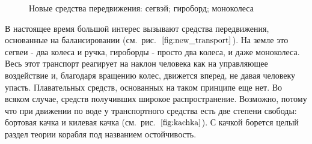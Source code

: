 \documentclass[12pt,a4paper]{article}
\begin{document}
\begin{figure}[ht!]  
	\vspace{4ex} 
	\centering {}  
	\hspace{4ex}
	\hspace{4ex}
	\caption{Новые средства передвижения:  сегвэй;  гироборд;  моноколеса} 
	\label{fig:new_transport}
\end{figure}


В настоящее время большой интерес вызывают средства передвижения, основанные на балансировании (см.~рис.~$\ref{fig:new_transport}$). На земле это сегвеи - два колеса и ручка, гироборды - просто два колеса, и даже моноколеса. Весь этот транспорт реагирует на наклон человека как на управляющее воздействие и, благодаря вращению колес, движется вперед, не давая человеку упасть. Плавательных средств, основанных на таком принципе еще нет. Во всяком случае, средств получивших широкое распространение. Возможно, потому что при движении по воде у транспортного средства есть две степени свободы: бортовая качка и килевая качка (см.~рис.~$\ref{fig:kachka}$). С качкой борется целый раздел теории корабля под названием остойчивость. 
\end{document}
